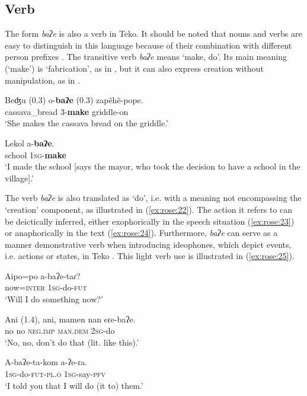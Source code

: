 \documentclass[output=paper]{langscibook}
\begin{document}
\subsection{Verb}
\label{sec:rose:2.4}
The form \textit{baʔe} is also a verb in Teko. It should be noted that nouns and verbs are easy to distinguish in this language because of their combination with different person prefixes \citep[27]{Rose2011}. The transitive verb \textit{baʔe} means ‘make, do’. Its main meaning (‘make’) is ‘fabrication’, as in , but it can also express creation without manipulation, as in .

\ea \label{ex:rose:20}
\gll Beʤu (0.3)  o-\textbf{baʔe} (0.3)  zapẽhẽ-pope.\\
cassava\_bread {} 3-\textbf{make} {} griddle-on\\
\glt ‘She makes the cassava bread on the griddle.’ 
\z 


\ea \label{ex:rose:21}
\gll Lekol     a-\textbf{baʔe}.\\
school  1\textsc{sg}{}-\textbf{make}\\
\glt ‘I made the school [says the mayor, who took the decision to have a school in the village].’ 
\z 

The verb \textit{baʔe} is also translated as ‘do’, i.e. with a meaning not encompassing the ‘creation’ component, as illustrated in (\ref{ex:rose:22}). The action it refers to can be deictically inferred, either exophorically in the speech situation (\ref{ex:rose:23}) or anaphorically in the text (\ref{ex:rose:24}). Furthermore, \textit{baʔe} can serve as a manner demonstrative verb \citep{Guérin2015} when introducing ideophones, which depict events, i.e. actions or states, in Teko \citep{Rose2024}. This light verb use is illustrated in (\ref{ex:rose:25}).


\ea \label{ex:rose:22}
\gll Aipo=po            a-baʔe-taɾ?\\
     now=\textsc{inter}  1\textsc{sg}{}-do-\textsc{fut}\\
\glt ‘Will I do something now?’ 
\z 


\ea \label{ex:rose:23}
\gll Ani (1.4),  ani,  mamen  nan     eɾe-baʔe.\\
no {} no  \textsc{neg.imp}   \textsc{man.dem}   \textsc{2sg}{}-do\\
\glt  ‘No, no, don’t do that (lit. like this).’ 
\z 


\ea \label{ex:rose:24}
\gll A-baʔe-ta-kom        a-ʔe-ɾa.\\
1\textsc{sg}{}-do-\textsc{fut-pl.o}  1\textsc{sg}{}-say-\textsc{pfv}\\
\glt ‘I told you that I will do (it to) them.’ 
\z 
\end{document}
